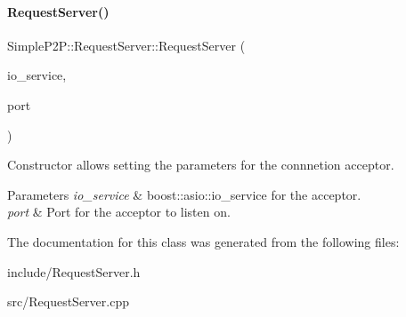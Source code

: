 \paragraph{\texorpdfstring{Request\+Server()}{RequestServer()}}
{\footnotesize\ttfamily Simple\+P2\+P\+::\+Request\+Server\+::\+Request\+Server (\begin{DoxyParamCaption}\item[{boost\+::asio\+::io\+\_\+service \&}]{io\+\_\+service,  }\item[{Uint16}]{port }\end{DoxyParamCaption})}



Constructor allows setting the parameters for the connnetion acceptor. 


\begin{DoxyParams}{Parameters}
{\em io\+\_\+service} & boost\+::asio\+::io\+\_\+service for the acceptor. \\
\hline
{\em port} & Port for the acceptor to listen on. \\
\hline
\end{DoxyParams}


The documentation for this class was generated from the following files\+:\begin{DoxyCompactItemize}
\item 
include/Request\+Server.\+h\item 
src/Request\+Server.\+cpp\end{DoxyCompactItemize}
